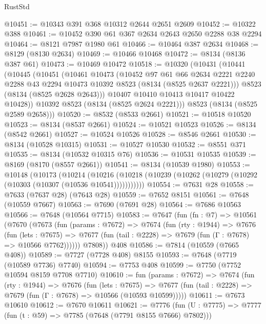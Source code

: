 \begin{lexlean}{RustStd}
\begin{coremodule}
@10451 := @10343 @391 @368 @10312 @2644 @2651 @2609
@10452 := @10322 @388
@10461 := @10452 @390 @61 @367 @2634 @2643 @2650 @2288 @38 @2294
@10464 := @8121 @7987 @1980 @61
@10466 := @10464 @387 @2634
@10468 := @8129 (@8130 @2634)
@10469 := @10466 @10468
@10472 := @8134 (@8136 @387 @61)
@10473 := @10469 @10472
@10518 := @10320
    (@10431
      (@10441
        (@10445
          (@10451
            (@10461
              @10473
              (@10452
                @97
                @61
                @66
                @2634
                @2221
                @2240
                @2288
                @43
                @2294
                @10473
                @10392
                @8523
                (@8134 (@8525 @2637 @2221)))
              @8523
              (@8134 (@8525 @2628 @2643)))
            @10407
            @10410
            @10413
            @10417
            @10422
            @10428))
        @10392
        @8523
        (@8134 (@8525 @2624 @2221)))
      @8523
      (@8134 (@8525 @2589 @2658)))
@10520 := @8532 (@8533 @2661)
@10521 := @10518 @10520
@10523 := @8134 (@8537 @2661)
@10524 := @10521 @10523
@10526 := @8134 (@8542 @2661)
@10527 := @10524 @10526
@10528 := @8546 @2661
@10530 := @8134 (@10528 @10315)
@10531 := @10527 @10530
@10532 := @8551 @371
@10535 := @8134 (@10532 @10315 @76)
@10536 := @10531 @10535
@10539 := @8169 (@8170 (@8557 @2661))
@10541 := @8134 (@10539 @1980)
@10553 := @10148
    (@10173
      (@10214
        (@10216 (@10218 (@10239 (@10262 (@10279 (@10292 (@10303 (@10307 (@10536 @10541)))))))))))
@10554 := @7631 @28
@10558 := @7633 (@7637 @28) (@7643 @28)
@10559 := @7652 @8151
@10561 := @7648 (@10559 @7667)
@10563 := @7690 (@7691 @28)
@10564 := @7686 @10563
@10566 := @7648 (@10564 @7715)
@10583 := @7647
    (fun (fn : @7) =>
    @10561
      (@7670
        (@7673
          (fun (params : @7672) =>
          @7674
            (fun (rty : @1944) =>
            @7676
              (fun (lets : @7675) =>
              @7677 (fun (tail : @2228) => @7679 (fun (Γ : @7678) => @10566 @7762))))))
        @7808))
    @408
@10586 := @7814 (@10559 (@7665 @408))
@10589 := @7727 (@7728 @408) @8155
@10593 := @7648 (@7719 (@10589 @7736) @7740)
@10594 := @7753 @408
@10599 := @7750 (@7752 @10594 @8159 @7708 @7710)
@10610 := fun (params : @7672) =>
  @7674
    (fun (rty : @1944) =>
    @7676
      (fun (lets : @7675) =>
      @7677 (fun (tail : @2228) => @7679 (fun (Γ : @7678) => @10566 (@10593 @10599)))))
@10611 := @7673 @10610
@10612 := @7670 @10611
@10621 := @7776
    (fun (U : @7775) => @7777 (fun (t : @59) => @7785 (@7648 (@7791 @8155 @7666) @7802)))

\end{coremodule}
\end{lexlean}
